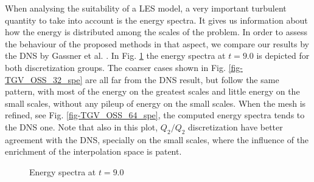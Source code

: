 When analysing the suitability of a LES model, a very important turbulent quantity to take into account is the energy spectra. It gives us information about how the energy is distributed among the scales of the problem. In order to assess the behaviour of the proposed methods in that aspect, we compare our results by the DNS by Gassner et al. \cite{gassner_accuracy_2013}. In Fig. \ref{fig-TGV_OSS_spe} the energy spectra at $t=9.0$ is depicted for both discretization groups. The coarser cases shown in Fig. \ref{fig-TGV_OSS_32_spe} are all far from the DNS result, but follow the same pattern, with most of the energy on the greatest scales and little energy on the small scales, without any pileup of energy on the small scales. When the mesh is refined, see Fig. \ref{fig-TGV_OSS_64_spe}, the computed energy spectra tends to the DNS one. Note that also in this plot, $Q_2/Q_2$ discretization have better agreement with the DNS, specially on the small scales, where the influence of the enrichment of the interpolation space is patent.
\begin{figure}[h]
  \centering
  \caption{Energy spectra at $t=9.0$}
  \label{fig-TGV_OSS_spe}
\end{figure}

